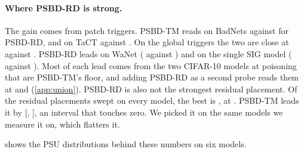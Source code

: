 \paragraph{Where PSBD-RD is strong.}
The gain comes from patch triggers. PSBD-TM reads \SurvivalTmBadnetATwooAuroc{} on BadNets against \SurvivalRdBadnetATwooAuroc{} for PSBD-RD, and \SurvivalTmTactAuroc{} on TaCT against \SurvivalRdTactAuroc{}. On the global triggers the two are close at \SurvivalTmGlobalAuroc{} against \SurvivalRdGlobalAuroc{}. PSBD-RD leads on WaNet (\SurvivalRdWanetAuroc{} against \SurvivalTmWanetAuroc{}) and on the single SIG model (\SurvivalRdSigAuroc{} against \SurvivalTmSigAuroc{}). Most of each lead comes from the two CIFAR-10 models at \PanelRateHigh{} poisoning that are PSBD-TM's floor, and adding PSBD-RD as a second probe reads them at \ProbeUnionWanetCifarOneZeroTmRd{} and \ProbeUnionSigCifarOneZeroTmRd{} (\cref{app:union}). PSBD-RD is also not the strongest residual placement. Of the \BestResidualCandidates{} residual placements swept on every model, the best is \BestResidualName{}, at \BestResidualAuroc{}. PSBD-TM leads it by \BestResidualGain{} [\BestResidualGainLow{}, \BestResidualGainHigh{}], an interval that touches zero. We picked it on the same models we measure it on, which flatters it.

 shows the PSU distributions behind these numbers on six models.
